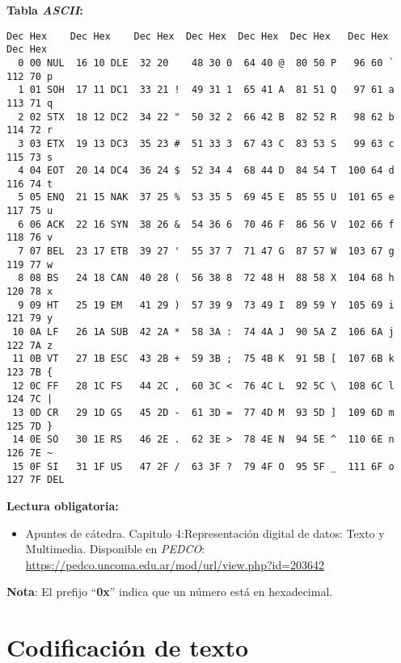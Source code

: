 \documentclass[12pt]{article}
\begin{document}
\textbf{Tabla \emph{ASCII}:}
\begin{verbatim}
Dec Hex    Dec Hex    Dec Hex  Dec Hex  Dec Hex  Dec Hex   Dec Hex   Dec Hex
  0 00 NUL  16 10 DLE  32 20    48 30 0  64 40 @  80 50 P   96 60 `  112 70 p
  1 01 SOH  17 11 DC1  33 21 !  49 31 1  65 41 A  81 51 Q   97 61 a  113 71 q
  2 02 STX  18 12 DC2  34 22 "  50 32 2  66 42 B  82 52 R   98 62 b  114 72 r
  3 03 ETX  19 13 DC3  35 23 #  51 33 3  67 43 C  83 53 S   99 63 c  115 73 s
  4 04 EOT  20 14 DC4  36 24 $  52 34 4  68 44 D  84 54 T  100 64 d  116 74 t
  5 05 ENQ  21 15 NAK  37 25 %  53 35 5  69 45 E  85 55 U  101 65 e  117 75 u
  6 06 ACK  22 16 SYN  38 26 &  54 36 6  70 46 F  86 56 V  102 66 f  118 76 v
  7 07 BEL  23 17 ETB  39 27 '  55 37 7  71 47 G  87 57 W  103 67 g  119 77 w
  8 08 BS   24 18 CAN  40 28 (  56 38 8  72 48 H  88 58 X  104 68 h  120 78 x
  9 09 HT   25 19 EM   41 29 )  57 39 9  73 49 I  89 59 Y  105 69 i  121 79 y
 10 0A LF   26 1A SUB  42 2A *  58 3A :  74 4A J  90 5A Z  106 6A j  122 7A z
 11 0B VT   27 1B ESC  43 2B +  59 3B ;  75 4B K  91 5B [  107 6B k  123 7B {
 12 0C FF   28 1C FS   44 2C ,  60 3C <  76 4C L  92 5C \  108 6C l  124 7C |
 13 0D CR   29 1D GS   45 2D -  61 3D =  77 4D M  93 5D ]  109 6D m  125 7D }
 14 0E SO   30 1E RS   46 2E .  62 3E >  78 4E N  94 5E ^  110 6E n  126 7E ~
 15 0F SI   31 1F US   47 2F /  63 3F ?  79 4F O  95 5F _  111 6F o  127 7F DEL
\end{verbatim}

\textbf{Lectura obligatoria:}

\vspace{-2\topsep}
\begin{itemize}

    \itemsep2pt \parskip0pt 

    \item Apuntes de cátedra. Capitulo 4:Representación digital de datos:
        Texto y Multimedia. Disponible en \textit{PEDCO}:
        \url{https://pedco.uncoma.edu.ar/mod/url/view.php?id=203642}

\end{itemize}

\textbf{Nota}: El prefijo ``\textbf{0x}'' indica que un número está en
hexadecimal.

\section{Codificación de texto}
\end{document}
